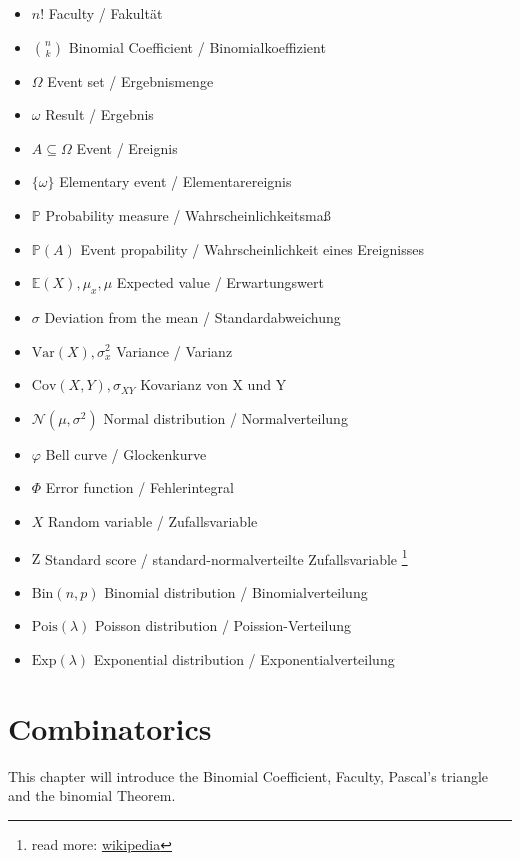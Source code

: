 \documentclass[twoside, a4paper, twocolumn]{article}
\begin{document}
    \begin{itemize}
       \item $n!$ Faculty / Fakultät
       \item $\binom{n}{k}$ Binomial Coefficient / Binomialkoeffizient
       \item $\Omega$ Event set / Ergebnismenge
       \item $\omega$ Result / Ergebnis
       \item $A \subseteq \Omega$ Event / Ereignis
       \item $\{\omega\}$ Elementary event / Elementarereignis
       \item $\mathbb{P}$ Probability measure / Wahrscheinlichkeitsmaß
       \item $\mathbb{P}(A)$ Event propability / Wahrscheinlichkeit eines Ereignisses
       \item $\mathbb{E}(X), \mu_x, \mu$ Expected value / Erwartungswert
       \item $\sigma$ Deviation from the mean / Standardabweichung
       \item $\mathrm{Var}(X), \sigma^2_x$ Variance / Varianz
       \item $\mathrm{Cov}(X,Y), \sigma_{XY}$ Kovarianz von X und Y
       \item $\mathcal{N}(\mu, \sigma^2)$ Normal distribution / Normalverteilung
       \item $\varphi$ Bell curve / Glockenkurve
       \item $\Phi$ Error function / Fehlerintegral
       \item $X$ Random variable / Zufallsvariable
       \item $\mathrm{Z}$ Standard score / standard-normalverteilte
           Zufallsvariable
           \footnote{read more: \href{https://en.wikipedia.org/wiki/Standard_score}{wikipedia}}
       \item $\textrm{Bin}(n, p)$ Binomial distribution / Binomialverteilung
       \item $\textrm{Pois}(\lambda)$ Poisson distribution / Poission-Verteilung
       \item $\textrm{Exp}(\lambda)$ Exponential distribution / Exponentialverteilung
    \end{itemize}

    \section{Combinatorics}
    This chapter will introduce the Binomial Coefficient, Faculty, Pascal's
    triangle and the binomial Theorem.
\end{document}
